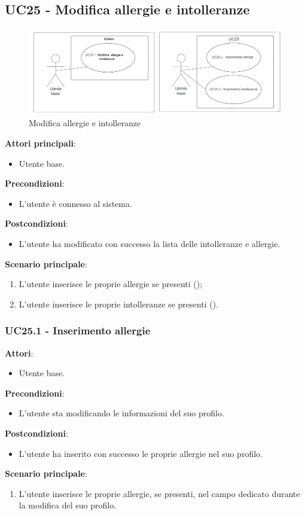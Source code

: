 \subsection{UC25 - Modifica allergie e intolleranze}\label{usecase:25}
\begin{figure}[H]
    \centering
    \includegraphics[width=0.75\linewidth]{ucd/ucd25.png}
    \caption{Modifica allergie e intolleranze}
\end{figure}
\textbf{Attori principali}:
\begin{itemize}
    \item Utente base.
\end{itemize}
\textbf{Precondizioni}:
\begin{itemize}
    \item L'utente è connesso al sistema.
\end{itemize}
\textbf{Postcondizioni}:
\begin{itemize}
    \item L'utente ha modificato con successo la lista delle intolleranze e allergie.
\end{itemize}
\textbf{Scenario principale}:
\begin{enumerate}
    \item L'utente inserisce le proprie allergie se presenti ();
    \item L'utente inserisce le proprie intolleranze se presenti ().
\end{enumerate}

  
\subsubsection{UC25.1 - Inserimento allergie}\label{usecase:25_1}
\textbf{Attori}:
\begin{itemize}
    \item Utente base.
\end{itemize}
\textbf{Precondizioni}:
\begin{itemize}
    \item L'utente sta modificando le informazioni del suo profilo.
\end{itemize}
\textbf{Postcondizioni}:
\begin{itemize}
    \item L'utente ha inserito con successo le proprie allergie nel suo profilo.
\end{itemize}
\textbf{Scenario principale}:
\begin{enumerate}
    \item L'utente inserisce le proprie allergie, se presenti, nel campo dedicato durante la modifica del suo profilo.
\end{enumerate}

